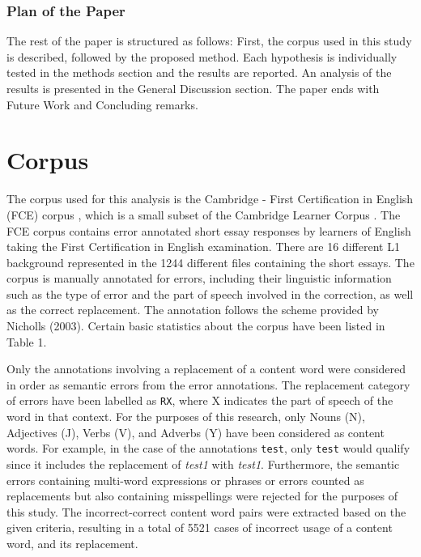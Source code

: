 \documentclass[10pt,letterpaper]{article}
\begin{document}
\subsubsection{Plan of the Paper} The rest of the paper is structured as follows: First, the corpus used in this study is described, followed by the proposed method. Each hypothesis is individually tested in the methods section and the results are reported. An analysis of the results is presented in the General Discussion section. The paper ends with Future Work and Concluding remarks. 


\section{Corpus}

The corpus used for this analysis is the Cambridge - First Certification in English (FCE) corpus \cite{yannakoudakisNewDatasetMethod2011}, which is a small subset of the Cambridge Learner Corpus \cite{nichollsCambridgeLearnerCorpus}. The FCE corpus contains error annotated short essay responses by learners of English taking the First Certification in English examination. There are 16 different L1 background represented in the 1244 different files containing the short essays. The corpus is manually annotated for errors, including their linguistic information such as the type of error and the part of speech involved in the correction, as well as the correct replacement. The annotation follows the scheme provided by Nicholls (2003). Certain basic statistics about the corpus have been listed in Table 1.

Only the annotations involving a replacement of a content word were considered in order as semantic errors from the error annotations. The replacement category of errors have been labelled as \texttt{RX}, where X indicates the part of speech of the word in that context. For the purposes of this research, only Nouns (N), Adjectives (J), Verbs (V), and Adverbs (Y) have been considered as content words. For example, in the case of the annotations \texttt{test}, only \texttt{test} would qualify since it includes the replacement of \textit{test1} with \textit{test1}. Furthermore, the semantic errors containing multi-word expressions or phrases or errors counted as replacements but also containing misspellings were rejected for the purposes of this study. The incorrect-correct content word pairs were extracted based on the given criteria, resulting in a total of 5521 cases of incorrect usage of a content word, and its replacement.
\end{document}
